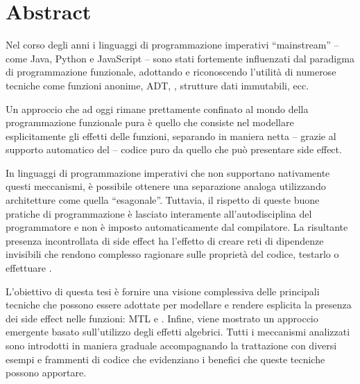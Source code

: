 \chapter*{Abstract}

Nel corso degli anni i linguaggi di programmazione imperativi ``mainstream'' -- come Java, Python e JavaScript -- sono stati fortemente influenzati dal paradigma di programmazione funzionale, adottando e riconoscendo l'utilità di numerose tecniche come funzioni anonime, \ac{ADT}, , strutture dati immutabili, ecc.

Un approccio che ad oggi rimane prettamente confinato al mondo della programmazione funzionale pura è quello che consiste nel modellare esplicitamente gli effetti delle funzioni, separando in maniera netta -- grazie al supporto automatico del  -- codice puro da quello che può presentare side effect.

In linguaggi di programmazione imperativi che non supportano nativamente questi meccanismi, è possibile ottenere una separazione analoga utilizzando architetture come quella ``esagonale''. Tuttavia, il rispetto di queste buone pratiche di programmazione è lasciato interamente all'autodisciplina del programmatore e non è imposto automaticamente dal compilatore.
La risultante presenza incontrollata di side effect ha l'effetto di creare reti di dipendenze invisibili che rendono complesso ragionare sulle proprietà del codice, testarlo o effettuare .

L'obiettivo di questa tesi è fornire una visione complessiva delle principali tecniche che possono essere adottate per modellare e rendere esplicita la presenza dei side effect nelle funzioni: \ac{MTL} e .
Infine, viene mostrato un approccio emergente basato sull'utilizzo degli effetti algebrici.
Tutti i meccanismi analizzati sono introdotti in maniera graduale accompagnando la trattazione con diversi esempi e frammenti di codice che evidenziano i benefici che queste tecniche possono apportare.

